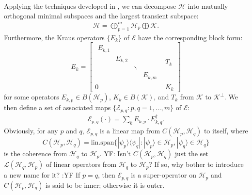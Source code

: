\documentclass[journal]{IEEEtran}
\def\h{\ensuremath{\mathcal{H}}}
\def\l{\ensuremath{\mathcal{L}}}
\def\k{\ensuremath{\mathcal{K}}}
\def\e{\ensuremath{\mathcal{E}}}
\def\l{\ensuremath{\mathcal{L}}}
\def\l{\mathcal{L}}
\def\k{\mathcal{K}}
\newcommand{\authorComment}[3]{\color{#1}#2: {#3} :#2\color{black}}
\newcommand{\yf}[1]{\authorComment{blue}{YF}{#1}}
\begin{document}
Applying the techniques developed in \cite{ying2013reachability,baumgartner2012structure}, we can decompose $\h$ into mutually orthogonal minimal subspaces and the largest transient subspace: 
\begin{eqnarray}\label{eq_mini_dec}
  \h=\bigoplus_{p=1}^m\h_p\bigoplus\k.
\end{eqnarray}
Furthermore, the Kraus operators $\{E_k\}$ of $\e$ have the  corresponding block form:
$$\renewcommand{\arraystretch}{1.2}
E_k=\left[\begin{array}{c|c}
  \begin{array}{cccc}
  E_{k,1} & & &\\
  & E_{k,2}  & &\\
  & & \ddots &\\
  & & & E_{k,m}  
  \end{array} & T_k\\
  \hline
0&K_k
\end{array}\right]$$
 for some operators $E_{k,p}\in B(\h_p)$, $K_k\in B(\k)$, and $T_k$ from $\k$ to $\k^\perp$. 
We then define a set of associated maps $\{\e_{p,q} : p,q = 1, \dots, m\}$ of $\e$:
\begin{eqnarray}\label{Eq_ass_maps}
  \e_{p,q}(\cdot)=\sum_{k} E_{k,p}\cdot E_{k,q}^\dagger.
\end{eqnarray}
Obviously, for any $p$ and $q$, $\e_{p,q}$ is a linear  map from $C(\h_p,\h_q)$ to itself, where 
\[
	C(\h_p,\h_q)=\textrm{lin.span}\{|\psi_{p}\rangle\langle\psi_q | : |\psi_{p}\rangle\in \h_{p}, |\psi_{q}\rangle\in \h_{q}\}
\]
is the coherence from $\h_q$ to $\h_p$. \yf{Isn't $C(\h_p,\h_q)$ just the set $\l(\h_q, \h_p)$ of linear operators from $\h_q$ to $\h_p$? If so, why bother to introduce a new name for it?} If $p=q$, then $\e_{p,q}$ is a super-operator on $\h_p$ and $C(\h_p,\h_q)$  is said to be inner; otherwise it is outer. 
\end{document}

